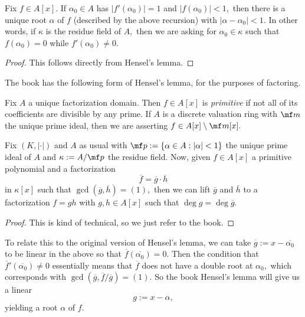 \documentclass[../notes.tex]{subfiles}
\begin{document}
\begin{corollary}
	Fix $f\in A[x].$ If $\alpha_0\in A$ has $|f'(\alpha_0)|=1$ and $|f(\alpha_0)|<1,$ then there is a unique root $\alpha$ of $f$ (described by the above recursion) with $|\alpha-\alpha_0|<1.$ In other words, if $\kappa$ is the residue field of $A,$ then we are asking for $\alpha_0\in\kappa$ such that $f(\alpha_0)=0$ while $f'(\alpha_0)\ne0.$
\end{corollary}
\begin{proof}
	This follows directly from Hensel's lemma.
\end{proof}
The book has the following form of Hensel's lemma, for the purposes of factoring.
\begin{definition}[Primitive]
	Fix $A$ a unique factorization domain. Then $f\in A[x]$ is \textit{primitive} if not all of its coefficients are divisible by any prime. If $A$ is a discrete valuation ring with $\mf m$ the unique prime ideal, then we are asserting $f\in A[x]\setminus\mf m[x].$
\end{definition}
\begin{lemma}[Hensel, II]
	Fix $(K,|\cdot|)$ and $A$ as usual with $\mf p:=\{\alpha\in A:|\alpha|<1\}$ the unique prime ideal of $A$ and $\kappa:=A/\mf p$ the residue field. Now, given $f\in A[x]$ a primitive polynomial and a factorization
	\[\overline f=\overline g\cdot\overline h\]
	in $\kappa[x]$ such that $\gcd(\overline g,\overline h)=(1),$ then we can lift $\overline g$ and $\overline h$ to a factorization $f=gh$ with $g,h\in A[x]$ such that $\deg g=\deg\overline g.$
\end{lemma}
\begin{proof}
	This is kind of technical, so we just refer to the book.
\end{proof}
\begin{remark}
	To relate this to the original version of Hensel's lemma, we can take $\overline g:=x-\overline{\alpha_0}$ to be linear in the above so that $\overline f(\overline{\alpha_0})=0.$ Then the condition that $\overline f'(\overline{\alpha_0})\ne0$ essentially means that $\overline f$ does not have a double root at $\alpha_0,$ which corresponds with $\gcd(\overline g,\overline f/\overline g)=(1).$ So the book Hensel's lemma will give us a linear
	\[g:=x-\alpha,\]
	yielding a root $\alpha$ of $f.$
\end{remark}
\end{document}
